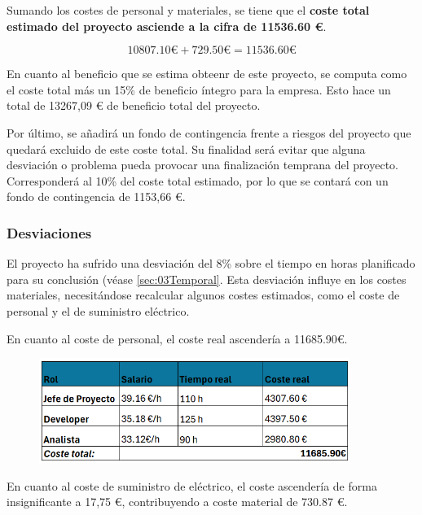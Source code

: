 Sumando los costes de personal y materiales, se tiene que el \textbf{coste total estimado del proyecto asciende a la cifra de 11536.60 €}.

\begin{equation}
    10807.10\text{€} + 729.50\text{€} =  11536.60 \text{€}
\end{equation}

En cuanto al beneficio que se estima obteenr de este proyecto, se computa como el coste total más un 15\% de beneficio íntegro para la empresa. Esto hace un total de 13267,09 € de beneficio total del proyecto.

Por último, se añadirá un fondo de contingencia frente a riesgos del proyecto que quedará excluido de este coste total. Su finalidad será evitar que alguna desviación o problema pueda provocar una finalización temprana del proyecto. Corresponderá al 10\% del coste total estimado, por lo que se contará con un fondo de contingencia de 1153,66 €.

\subsubsection{Desviaciones}

El proyecto ha sufrido una desviación del 8\% sobre el tiempo en horas planificado para su conclusión (véase \ref{sec:03Temporal}. Esta desviación influye en los costes materiales, necesitándose recalcular algunos costes estimados, como el coste de personal y el de suministro eléctrico. 

En cuanto al coste de personal, el coste real ascendería a 11685.90€.%

\begin{figure}[H]
    \centering
    \includegraphics[width=0.90\textwidth]{tables/costeRealcap.png}
    \label{table:costeRealcap}
\end{figure}

En cuanto al coste de suministro de eléctrico, el coste ascendería de forma insignificante a 17,75 €, contribuyendo a coste material de 730.87 €. 


